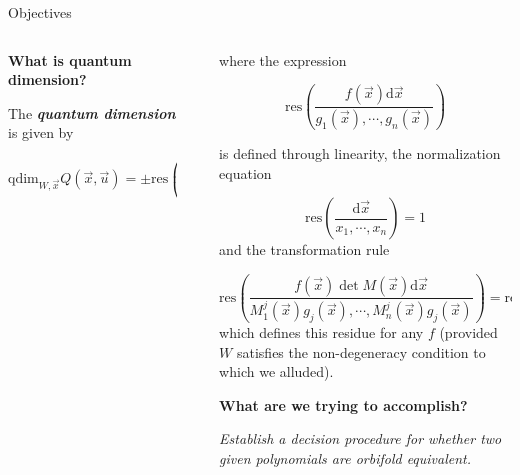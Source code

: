 \documentclass[final]{beamer}
\newlength{\sepwid}
\newlength{\onecolwid}
\newlength{\smallercolwid}
\begin{document}
\begin{frame}[t]
\begin{alertblock}{Objectives}
\begin{columns}
\begin{column}{\smallercolwid}
\textbf{\large{}What is quantum dimension?}{\large \par}

The \textbf{\emph{quantum dimension }}is given by

\[
\mathrm{qdim}_{W,\vec{x}}Q(\vec{x},\vec{u})=\pm\mathrm{res}\left(\frac{\mathrm{str}(\partial_{x_{1}}Q\cdots\partial_{x_{n}}Q\partial_{u_{1}}Q\cdots\partial_{u_{m}}Q)\mathrm{d}\vec{x}}{\partial_{x_{1}}W,\cdots,\partial_{x_{n}}W}\right)
\]

\end{column} %
\begin{column}{\sepwid}\end{column} %
\begin{column}{\onecolwid} %

where the expression

\[
\mathrm{res}\left(\frac{f(\vec{x})\mathrm{d}\vec{x}}{g_{1}(\vec{x}),\cdots,g_{n}(\vec{x})}\right)
\]

is defined through linearity, the normalization equation

\[
\mathrm{res}\left(\frac{\mathrm{d}\vec{x}}{x_{1},\cdots,x_{n}}\right)=1
\]
and the transformation rule

\[
\mathrm{res}\left(\frac{f(\vec{x})\det M(\vec{x})\mathrm{d}\vec{x}}{M_{1}^{j}(\vec{x})g_{j}(\vec{x}),\cdots,M_{n}^{j}(\vec{x})g_{j}(\vec{x})}\right)=\mathrm{res}\left(\frac{f(\vec{x})\mathrm{d}\vec{x}}{g_{1}(\vec{x}),\cdots,g_{n}(\vec{x})}\right)
\]
which defines this residue for any $f$ (provided $W$ satisfies the
non-degeneracy condition to which we alluded).

\bigskip

\textbf{\large{}What are we trying to accomplish?}{\large \par}

\emph{Establish a decision procedure for whether two given polynomials
are orbifold equivalent.}

\end{column}
\end{columns}

\end{alertblock}

\begin{columns}[t] %

\begin{column}{\sepwid}\end{column} %


\end{columns}
\end{frame}
\end{document}
